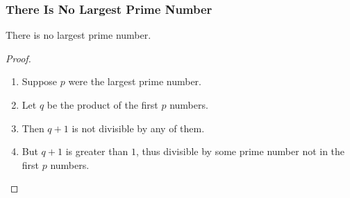 \documentclass[fleqn,aspectratio=169,dutch]{beamer}
\begin{document}
\begin{frame} 
\frametitle{There Is No Largest Prime Number} 
\begin{theorem}
There is no largest prime number.
\end{theorem} 
\begin{proof}
\begin{enumerate} 
\item<1-| alert@1> Suppose $p$ were the largest prime number. 
\item<2-> Let $q$ be the product of the first $p$ numbers. 
\item<3-> Then $q+1$ is not divisible by any of them. 
\item<1-> But $q + 1$ is greater than $1$, thus divisible by some prime
number not in the first $p$ numbers.
\end{enumerate}
\end{proof}
\end{frame}


%
%
%
%

\beamerthemethuasbackframe
\end{document}
